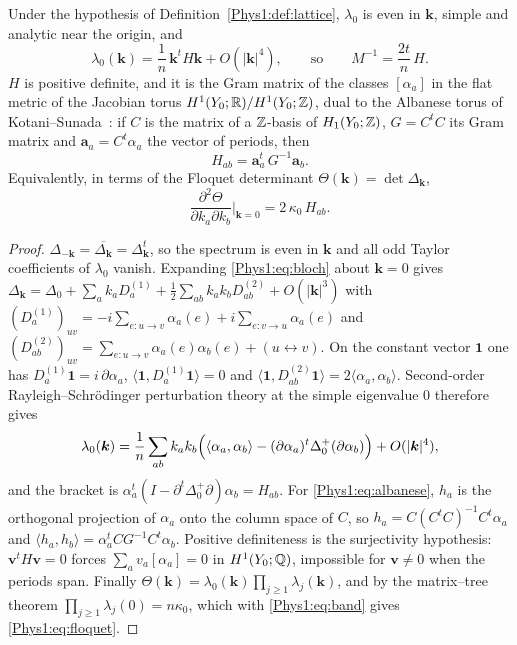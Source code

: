 \begin{theorem}\label{Phys1:thm:mass}
Under the hypothesis of Definition~\ref{Phys1:def:lattice}, $\lambda_0$ is even in $\bm k$,
simple and analytic near the origin, and
\begin{equation}\label{Phys1:eq:band}
\lambda_0(\bm k)=\frac1n\,\bm k^{t}H\bm k+O(|\bm k|^{4}),
\qquad\text{so}\qquad
M^{-1}=\frac{2t}{n}\,H .
\end{equation}
$H$ is positive definite, and it is the Gram matrix of the classes $[\alpha_a]$ in the flat
metric of the Jacobian torus $H^{1}(Y_0;\mathbb{R})/H^{1}(Y_0;\mathbb{Z})$, dual to the Albanese torus of
Kotani--Sunada~\cite{KS2}: if $C$ is the matrix of a $\mathbb{Z}$-basis of $H_1(Y_0;\mathbb{Z})$,
$G=C^{t}C$ its Gram matrix and $\bm a_a=C^{t}\alpha_a$ the vector of periods, then
\begin{equation}\label{Phys1:eq:albanese}
H_{ab}=\bm a_a^{t}\,G^{-1}\bm a_b .
\end{equation}
Equivalently, in terms of the Floquet determinant $\Theta(\bm k)=\det\Delta_{\bm k}$,
\begin{equation}\label{Phys1:eq:floquet}
\frac{\partial^{2}\Theta}{\partial k_a\partial k_b}\Big|_{\bm k=0}=2\,\kappa_0\,H_{ab}.
\end{equation}
\end{theorem}

\begin{proof}
$\Delta_{-\bm k}=\overline{\Delta_{\bm k}}=\Delta_{\bm k}^{t}$, so the spectrum is even in
$\bm k$ and all odd Taylor coefficients of $\lambda_0$ vanish. Expanding
\eqref{Phys1:eq:bloch} about $\bm k=0$ gives $\Delta_{\bm k}=\Delta_0+\sum_a k_aD^{(1)}_a
+\tfrac12\sum_{ab}k_ak_bD^{(2)}_{ab}+O(|\bm k|^{3})$ with
$(D^{(1)}_a)_{uv}=-i\sum_{e\colon u\to v}\alpha_a(e)+i\sum_{e\colon v\to u}\alpha_a(e)$ and
$(D^{(2)}_{ab})_{uv}=\sum_{e\colon u\to v}\alpha_a(e)\alpha_b(e)+(u\!\leftrightarrow\!v)$.
On the constant vector $\bm1$ one has $D^{(1)}_a\bm1=i\,\partial\alpha_a$,
$\langle\bm1,D^{(1)}_a\bm1\rangle=0$ and
$\langle\bm1,D^{(2)}_{ab}\bm1\rangle=2\langle\alpha_a,\alpha_b\rangle$. Second-order
Rayleigh--Schr\"odinger perturbation theory at the simple eigenvalue $0$ therefore gives
\[
\lambda_0(\bm k)=\frac1n\sum_{ab}k_ak_b\Bigl(\langle\alpha_a,\alpha_b\rangle
-(\partial\alpha_a)^{t}\Delta_0^{+}(\partial\alpha_b)\Bigr)+O(|\bm k|^{4}),
\]
and the bracket is $\alpha_a^{t}(I-\partial^{t}\Delta_0^{+}\partial)\alpha_b=H_{ab}$. For
\eqref{Phys1:eq:albanese}, $h_a$ is the orthogonal projection of $\alpha_a$ onto the column space
of $C$, so $h_a=C(C^{t}C)^{-1}C^{t}\alpha_a$ and
$\langle h_a,h_b\rangle=\alpha_a^{t}CG^{-1}C^{t}\alpha_b$. Positive definiteness is the
surjectivity hypothesis: $\bm v^{t}H\bm v=0$ forces $\sum_av_a[\alpha_a]=0$ in
$H^{1}(Y_0;\mathbb{Q})$, impossible for $\bm v\neq0$ when the periods span. Finally
$\Theta(\bm k)=\lambda_0(\bm k)\prod_{j\ge1}\lambda_j(\bm k)$, and by the matrix--tree
theorem $\prod_{j\ge1}\lambda_j(0)=n\kappa_0$, which with \eqref{Phys1:eq:band} gives
\eqref{Phys1:eq:floquet}.
\end{proof}

